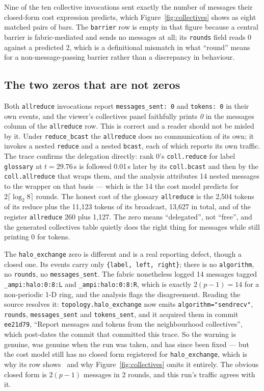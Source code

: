 \documentclass[11pt]{article}
\begin{document}
Nine of the ten collective invocations sent exactly the number of messages their
closed-form cost expression predicts, which Figure~\ref{fig:collectives} shows as eight
matched pairs of bars. The \texttt{barrier} row is empty in that figure because a central
barrier is fabric-mediated and sends no messages at all; its \texttt{rounds} field reads 0
against a predicted 2, which is a definitional mismatch in what ``round'' means for a
non-message-passing barrier rather than a discrepancy in behaviour.

\subsection*{The two zeros that are not zeros}

Both \texttt{allreduce} invocations report \texttt{messages\_sent: 0} and
\texttt{tokens: 0} in their own events, and the viewer's collectives panel faithfully
prints \emph{0} in the messages column of the \texttt{allreduce} row. This is correct and
a reader should not be misled by it. Under \texttt{reduce\_bcast} the \texttt{allreduce}
does no communication of its own; it invokes a nested \texttt{reduce} and a nested
\texttt{bcast}, each of which reports its own traffic. The trace confirms the delegation
directly: rank 0's \texttt{coll.reduce} for label \texttt{glossary} at $t=29.76$\,s is
followed 0.01\,s later by its \texttt{coll.bcast} and then by the \texttt{coll.allreduce}
that wraps them, and the analysis attributes 14 nested messages to the wrapper on that
basis --- which is the 14 the cost model predicts for $2\lceil\log_2 8\rceil$ rounds. The
honest cost of the glossary \texttt{allreduce} is the 2{,}504 tokens of its reduce plus
the 11{,}123 tokens of its broadcast, 13{,}627 in total, and of the register
\texttt{allreduce} 260 plus 1{,}127. The zero means ``delegated'', not ``free'', and the
generated collectives table quietly does the right thing for messages while still printing
0 for tokens.

The \texttt{halo\_exchange} zero is different and is a real reporting defect, though a
closed one. Its events carry only \texttt{\{label, left, right\}}; there is no
\texttt{algorithm}, no \texttt{rounds}, no \texttt{messages\_sent}. The fabric nonetheless
logged 14 messages tagged \texttt{\_ampi:halo:0:8:L} and \texttt{\_ampi:halo:0:8:R}, which
is exactly $2(p-1)=14$ for a non-periodic 1-D ring, and the analysis flags the
disagreement. Reading the source resolves it: \texttt{topology.halo\_exchange} now emits
\texttt{algorithm="sendrecv"}, \texttt{rounds}, \texttt{messages\_sent} and
\texttt{tokens\_sent}, and it acquired them in commit \texttt{ee21d79}, ``Report messages
and tokens from the neighbourhood collectives'', which post-dates the commit that
committed this trace. So the warning is genuine, was genuine when the run was taken, and
has since been fixed --- but the cost model still has no closed form registered for
\texttt{halo\_exchange}, which is why its row shows \modelna\ and why
Figure~\ref{fig:collectives} omits it entirely. The obvious closed form is $2(p-1)$
messages in 2 rounds, and this run's traffic agrees with it.
\end{document}
